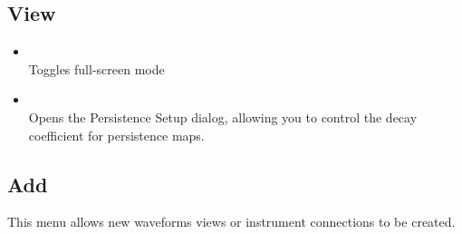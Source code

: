 \subsection{View}

\begin{itemize}

\item {}\\
Toggles full-screen mode

\item {}\\
Opens the Persistence Setup dialog, allowing you to control the decay coefficient for persistence maps.

\end{itemize}

\subsection{Add}

This menu allows new waveforms views or instrument connections to be created.

